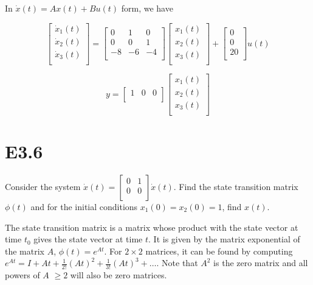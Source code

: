 \documentclass[11pt]{article}
\begin{document}
In $\dot x(t) = Ax(t) + Bu(t)$ form, we have

\[
\begin{bmatrix}
    \dot x_1(t) \\
    \dot x_2(t) \\
    \dot x_3(t) \\
\end{bmatrix}
=
\begin{bmatrix}
    0 & 1 & 0 \\
    0 & 0 & 1 \\
    -8 & -6 & -4 \\
\end{bmatrix}
\begin{bmatrix}
    x_1(t) \\
    x_2(t) \\
    x_3(t) \\
\end{bmatrix}
+
\begin{bmatrix}
    0 \\
    0 \\
    20 \\
\end{bmatrix}
u(t)
\]

\[
y = \begin{bmatrix}
    1 & 0 & 0 \\
\end{bmatrix}
\begin{bmatrix}
    x_1(t) \\
    x_2(t) \\
    x_3(t) \\
\end{bmatrix}
\]

\section{E3.6}

Consider the system $\dot x(t) = \begin{bmatrix} 0 & 1 \\ 0 & 0 \\ \end{bmatrix} \dot x(t)$. Find the state transition matrix $\phi(t)$ and for the initial conditions $x_1(0) = x_2(0) = 1$, find $x(t)$.

The state transition matrix is a matrix whose product with the state vector at time $t_0$ gives the state vector at time $t$. It is given by the matrix exponential of the matrix $A$, $\phi(t) = e^{At}$. For $2\times2$ matrices, it can be found by computing $e^{At} = I + At + \frac{1}{2!} (At)^2 + \frac{1}{3!} (At)^3 + \dots$. Note that $A^2$ is the zero matrix and all powers of $A$ $\geq 2$ will also be zero matrices.
\end{document}
